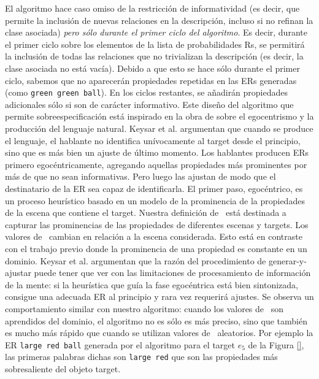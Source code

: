 El algoritmo hace caso omiso de la restricci\'on de informatividad (es decir, que permite la inclusi\'on de nuevas relaciones
en la descripci\'on, incluso si no refinan la clase asociada) \emph{pero s\'olo durante el
primer ciclo del algoritmo}. Es decir, durante el primer ciclo sobre los elementos de la
lista de probabilidades Rs, se permitir\'a la inclusi\'on de todas las relaciones que no trivializan la
descripci\'on (es decir, la clase asociada no est\'a vac\'{i}a). Debido a que esto se hace s\'olo durante
el primer ciclo, sabemos que no aparecer\'an propiedades repetidas en las ERs generadas (como \texttt{green green ball}).
En los ciclos restantes, se a\~nadir\'an propiedades adicionales s\'olo si son de car\'acter informativo.
Este dise\~no del algoritmo que permite sobreespecificaci\'on est\'a inspirado en la obra de \cite{keysar:Curr98} sobre el egocentrismo y la producci\'on del lenguaje natural. Keysar et al. argumentan que cuando se produce el lenguaje, el hablante no identifica un\'ivocamente al target desde el principio, sino que  
es m\'as bien un ajuste de \'ultimo momento. Los hablantes producen ERs primero egoc\'entricamente, agregando aquellas propiedades m\'as prominentes por m\'as de que no sean informativas. Pero luego las ajustan de modo que el destinatario de la ER sea capaz de identificarla. El primer paso, egoc\'entrico, es un proceso
heur\'istico basado en un modelo de la prominencia de la propiedades de la escena que contiene el target. Nuestra definici\'on de
\puse\ est\'a destinada a capturar las prominencias de las propiedades de diferentes escenas y targets. Los valores de \puse\
cambian en relaci\'on a la escena considerada. Esto est\'a en contraste con el trabajo previo donde
la prominencia de una propiedad es constante en un dominio. Keysar et al. argumentan que la raz\'on del procedimiento de 
generar-y-ajustar puede tener que ver con las limitaciones de procesamiento de informaci\'on de la
mente: si la heur\'istica que gu\'ia la fase egoc\'entrica est\'a bien sintonizada, consigue una adecuada ER al principio
y rara vez requerir\'a ajustes. Se observa un comportamiento similar
con nuestro algoritmo: cuando los valores de \puse\ son
aprendidos del dominio, el algoritmo no es
s\'olo es m\'as preciso, sino que tambi\'en es mucho m\'as r\'apido que cuando se utilizan valores de \puse\ aleatorios. Por ejemplo la ER \texttt{large red ball} generada por el algoritmo para el target $e_5$ de la Figura \ref{}, las primeras palabras dichas son \texttt{large red} que son las propiedades m\'as sobresaliente del objeto target. 


